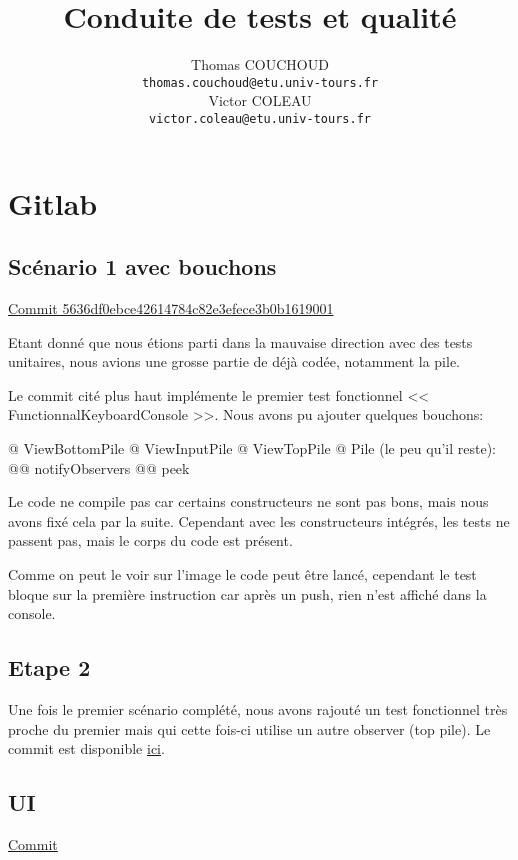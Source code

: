\documentclass{report}
\title{Conduite de tests et qualité}
\author{Thomas COUCHOUD\\\texttt{thomas.couchoud@etu.univ-tours.fr}\\Victor COLEAU\\\texttt{victor.coleau@etu.univ-tours.fr}}
\begin{document}
	\mccTitle

	\chapter{Gitlab}
		\section{Scénario 1 avec bouchons}
			\href{https://gitlab.com/MrCraftCod/conduitedetests/commit/5636df0ebce42614784c82e3efece3b0b1619001}{Commit 5636df0ebce42614784c82e3efece3b0b1619001}
			
			Etant donné que nous étions parti dans la mauvaise direction avec des tests unitaires, nous avions une grosse partie de déjà codée, notamment la pile.
			
			Le commit cité plus haut implémente le premier test fonctionnel << FunctionnalKeyboardConsole >>.
			Nous avons pu ajouter quelques bouchons:
			\begin{easylist}
				@ ViewBottomPile
				@ ViewInputPile
				@ ViewTopPile
				@ Pile (le peu qu'il reste):
				@@ notifyObservers
				@@ peek
			\end{easylist}

			Le code ne compile pas car certains constructeurs ne sont pas bons, mais nous avons fixé cela par la suite.
			Cependant avec les constructeurs intégrés, les tests ne passent pas, mais le corps du code est présent.
			
			
			Comme on peut le voir sur l'image le code peut être lancé, cependant le test bloque sur la première instruction car après un push, rien n'est affiché dans la console.
			
		\section{Etape 2}
			Une fois le premier scénario complété, nous avons rajouté un test fonctionnel très proche du premier mais qui cette fois-ci utilise un autre observer (top pile).
			Le commit est disponible \href{https://gitlab.com/MrCraftCod/conduitedetests/commit/5d63a2e3a8d360577cf3c889b28c2f8fdbfb6765}{ici}.
			
			
		\section{UI}
			\href{https://gitlab.com/MrCraftCod/conduitedetests/commit/ba863b4bd56417faadcdba22ef20eaef2a78cba1}{Commit}
		
\end{document}
